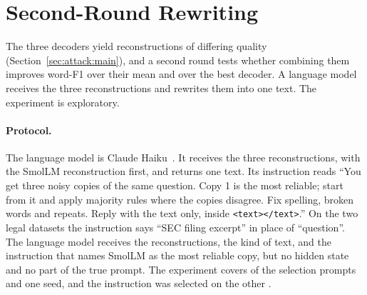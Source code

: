 \section{Second-Round Rewriting}\label{sec:attack:rewriting}

The three decoders yield reconstructions of differing quality (Section~\ref{sec:attack:main}), and a second round tests whether combining them improves word-F1 over their mean and over the best decoder.
A language model receives the three reconstructions and rewrites them into one text.
The experiment is exploratory.

\paragraph{Protocol.} The language model is Claude Haiku~.
It receives the three reconstructions, with the SmolLM reconstruction first, and returns one text. %
Its instruction reads ``You get three noisy copies of the same question. Copy 1 is the most reliable; start from it and apply majority rules where the copies disagree. Fix spelling, broken words and repeats. Reply with the text only, inside \texttt{<text></text>}.''
On the two legal datasets the instruction says ``SEC filing excerpt'' in place of ``question''.
The language model receives the reconstructions, the kind of text, and the instruction that names SmolLM as the most reliable copy, but no hidden state and no part of the true prompt.
The experiment covers  of the  selection prompts and one seed, and the instruction was selected on the other . %

